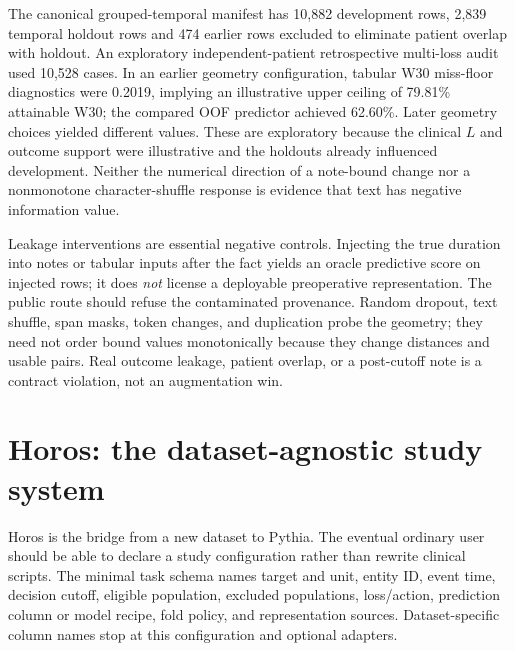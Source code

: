 \documentclass[11pt]{article}
\begin{document}
The canonical grouped-temporal manifest has 10,882 development rows, 2,839 temporal holdout rows and 474 earlier rows excluded to eliminate patient overlap with holdout. An exploratory independent-patient retrospective multi-loss audit used 10,528 cases. In an earlier geometry configuration, tabular W30 miss-floor diagnostics were 0.2019, implying an illustrative upper ceiling of 79.81\% attainable W30; the compared OOF predictor achieved 62.60\%. Later geometry choices yielded different values. These are exploratory because the clinical $L$ and outcome support were illustrative and the holdouts already influenced development. Neither the numerical direction of a note-bound change nor a nonmonotone character-shuffle response is evidence that text has negative information value.

Leakage interventions are essential negative controls. Injecting the true duration into notes or tabular inputs after the fact yields an oracle predictive score on injected rows; it does \emph{not} license a deployable preoperative representation. The public route should refuse the contaminated provenance. Random dropout, text shuffle, span masks, token changes, and duplication probe the geometry; they need not order bound values monotonically because they change distances and usable pairs. Real outcome leakage, patient overlap, or a post-cutoff note is a contract violation, not an augmentation win.

\section{Horos: the dataset-agnostic study system}
Horos is the bridge from a new dataset to Pythia. The eventual ordinary user should be able to declare a study configuration rather than rewrite clinical scripts. The minimal task schema names target and unit, entity ID, event time, decision cutoff, eligible population, excluded populations, loss/action, prediction column or model recipe, fold policy, and representation sources. Dataset-specific column names stop at this configuration and optional adapters.
\end{document}
